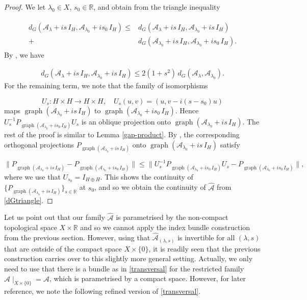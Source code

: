 \documentclass[a4paper,10pt]{article}
\DeclareMathOperator{\gra}{graph}
\begin{document}
\begin{proof}
We let $\lambda_0\in X$, $s_0\in\mathbb{R}$, and obtain from the triangle inequality

\begin{align}\label{dGtriangle}
\begin{split}
d_G(\mathcal{A}_\lambda+is\, I_H,\mathcal{A}_{\lambda_0}+is_0\, I_H)\leq&  d_G(\mathcal{A}_\lambda+is\, I_H,\mathcal{A}_{\lambda_0}+is\, I_H)\\
+&d_G(\mathcal{A}_{\lambda_0}+is\, I_H,\mathcal{A}_{\lambda_0}+is_0\, I_H).
\end{split}
\end{align}
By \cite[Thm. IV.2.17]{Kato}, we have  

\begin{align}\label{gap-estimate}
d_G(\mathcal{A}_\lambda+is\, I_H,\mathcal{A}_{\lambda_0}+is\, I_H)\leq 2(1+s^2)\,d_G(\mathcal{A}_\lambda,\mathcal{A}_{\lambda_0}).
\end{align}
For the remaining term, we note that the family of isomorphisms

\[U_s:H\times H\rightarrow H\times H,\quad U_s(u,v)=(u,v-i(s-s_0)u)\]
maps $\gra(\mathcal{A}_{\lambda_0}+is\, I_H)$ to $\gra(\mathcal{A}_{\lambda_0}+is_0\, I_H)$. Hence $U^{-1}_s P_{\gra(\mathcal{A}_{\lambda_0}+is_0\, I_H)}U_s$ is an oblique projection onto $\gra(\mathcal{A}_{\lambda_0}+is\, I_H)$. The rest of the proof is similar to Lemma \ref{gap-product}. By \cite[Thm. I.6.35]{Kato}, the corresponding orthogonal projections $P_{\gra(\mathcal{A}_{\lambda_0}+is\, I_H)}$ onto $\gra(\mathcal{A}_{\lambda_0}+is\, I_H)$ satisfy

\[\|P_{\gra(\mathcal{A}_{\lambda_0}+is\, I_H)}-P_{\gra(\mathcal{A}_{\lambda_0}+is_0\, I_H)}\|\leq \|U^{-1}_s P_{\gra(\mathcal{A}_{\lambda_0}+is_0\, I_H)}U_s- P_{\gra(\mathcal{A}_{\lambda_0}+is_0\, I_H)}\|,\]
where we use that $U_{s_0}=I_{H\oplus H}$. This shows the continuity of $\{P_{\gra(\mathcal{A}_{\lambda_0}+is\, I_H)}\}_{s\in\mathbb{R}}$ at $s_0$, and so we obtain the continuity of $\hat{\mathcal{A}}$ from \eqref{dGtriangle}.
\end{proof}
\noindent
Let us point out that our family $\hat{\mathcal{A}}$ is parametrised by the non-compact topological space $X\times\mathbb{R}$ and so we cannot apply the index bundle construction from the previous section. However, using that $\hat{\mathcal{A}}_{(\lambda,s)}$ is invertible for all $(\lambda,s)$ that are outside of the compact space $X\times\{0\}$, it is readily seen that the previous construction carries over to this slightly more general setting. Actually, we only need to use that there is a bundle as in \eqref{transversal} for the restricted family $\hat{\mathcal{A}}\mid_{X\times\{0\}}=\mathcal{A}$, which is parametrised by a compact space. However, for later reference, we note the following refined version of \eqref{transversal}.
\end{document}
